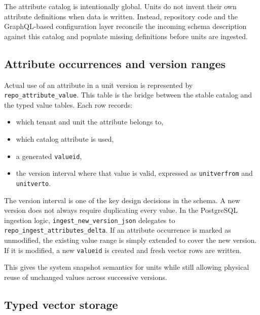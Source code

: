 The attribute catalog is intentionally global. Units do not invent their own attribute definitions when data is written. Instead, repository code and the GraphQL-based configuration layer reconcile the incoming schema description against this catalog and populate missing definitions before units are ingested.

\subsection{Attribute occurrences and version ranges}

Actual use of an attribute in a unit version is represented by \texttt{repo\_attribute\_value}. This table is the bridge between the stable catalog and the typed value tables. Each row records:
\begin{itemize}
\item which tenant and unit the attribute belongs to,
\item which catalog attribute is used,
\item a generated \texttt{valueid},
\item the version interval where that value is valid, expressed as \texttt{unitverfrom} and \texttt{unitverto}.
\end{itemize}

The version interval is one of the key design decisions in the schema. A new version does not always require duplicating every value. In the PostgreSQL ingestion logic, \texttt{ingest\_new\_version\_json} delegates to \texttt{repo\_ingest\_attributes\_delta}. If an attribute occurrence is marked as unmodified, the existing value range is simply extended to cover the new version. If it is modified, a new \texttt{valueid} is created and fresh vector rows are written.

This gives the system snapshot semantics for units while still allowing physical reuse of unchanged values across successive versions.

\subsection{Typed vector storage}

